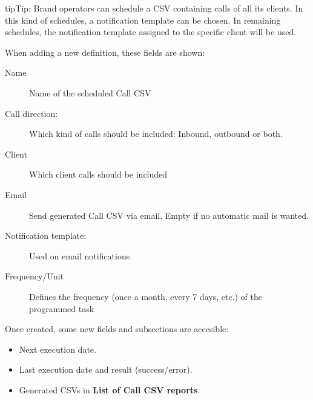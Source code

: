\documentclass[letterpaper,10pt,english]{sphinxmanual}
\begin{document}
\begin{notice}{tip}{Tip:}
Brand operators can schedule a CSV containing calls of all its clients.
In this kind of schedules, a notification template can be chosen. In remaining
schedules, the notification template assigned to the specific client will be used.
\end{notice}

When adding a new definition, these fields are shown:
\begin{description}
\item[{Name}] \leavevmode{}\label{administration_portal/client/retail/calls/call_csv_schedulers:term-name}
Name of the scheduled Call CSV

\item[{Call direction:}] \leavevmode{}\label{administration_portal/client/retail/calls/call_csv_schedulers:term-call-direction}
Which kind of calls should be included: Inbound, outbound or both.

\item[{Client}] \leavevmode{}\label{administration_portal/client/retail/calls/call_csv_schedulers:term-client}
Which client calls should be included

\item[{Email}] \leavevmode{}\label{administration_portal/client/retail/calls/call_csv_schedulers:term-email}
Send generated Call CSV via email. Empty if no automatic mail is wanted.

\item[{Notification template:}] \leavevmode{}\label{administration_portal/client/retail/calls/call_csv_schedulers:term-notification-template}
Used on email notifications

\item[{Frequency/Unit}] \leavevmode{}\label{administration_portal/client/retail/calls/call_csv_schedulers:term-frequency-unit}
Defines the frequency (once a month, every 7 days, etc.) of the programmed task

\end{description}

Once created, some new fields and subsections are accesible:
\begin{itemize}
\item {} 
Next execution date.

\item {} 
Last execution date and result (success/error).

\item {} 
Generated CSVs in \textbf{List of Call CSV reports}.

\end{itemize}
\end{document}

